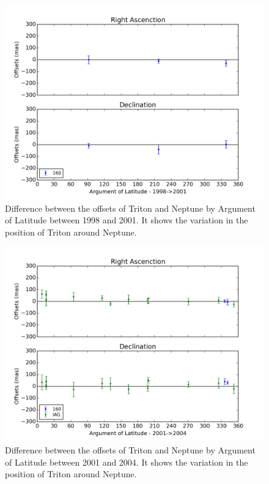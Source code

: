 \documentclass[12pt,a4paper]{report}
\begin{document}
\begin{figure}[H]
\includegraphics[width=16.0cm]{Anom_TN_1998-2001.png} 
\caption{Difference between the offsets of Triton and Neptune by Argument of Latitude between 1998 and 2001. It shows the variation in the position of Triton around Neptune.}
\label{Fig:triton-netuno-anom}
\end{figure}

\begin{figure}[H]
\includegraphics[width=16.0cm]{Anom_TN_2001-2004.png} 
\caption{Difference between the offsets of Triton and Neptune by Argument of Latitude between 2001 and 2004. It shows the variation in the position of Triton around Neptune.}
\label{Fig:triton-netuno-anom}
\end{figure}
\end{document}
